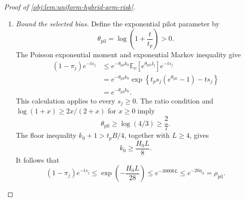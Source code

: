 \begin{proof}[Proof of \cref{obj:lem:uniform-hybrid-arm-risk}]
\begin{enumerate}
The inverse branch mean lies in \([0,p_j]\), by its explicit formula. Moreover,
\((\mathbb E_\nu[\mathcal P_j])^2\le
\mathbb E_\nu[\mathcal P_j^2]\). Hence
\[
\pi_j(1-\pi_j)\delta_j^2
\le
2\pi_j\mathbb E_\nu[\mathcal P_j^2]+2\pi_jp_j^2,
\]
and summing gives
\[
\sum_{j\in\mathcal J_{\mathrm{heavy}}}
\pi_j(1-\pi_j)\delta_j^2
\le
14\rho_{\mathrm{pil}}
\left(\frac1{u\epsilon}+1+\frac1t\right).
\]
Using the mixture variance identity and
\(\operatorname{Var}_\nu(\mathcal P_j)\le
\mathbb E_\nu[\mathcal P_j^2]\), we conclude
\[
\begin{aligned}
\sum_{j\in\mathcal J_{\mathrm{heavy}}}
\operatorname{Var}_\nu(\mathcal V_j)
\le{}&
\sum_{j\in\mathcal J_{\mathrm{heavy}}}
\operatorname{Var}_\nu(\mathcal H_j)\\
&+20\rho_{\mathrm{pil}}
\left(\frac1{u\epsilon}+1+\frac1t\right).
\end{aligned}
\]
Adding the light and heavy bounds proves
\[
\begin{aligned}
\sum_{j=1}^d\operatorname{Var}_\nu(\mathcal V_j)
\le{}&
\sum_{j=1}^d\operatorname{Var}_\nu(\mathcal H_j)\\
&+6F_{\mathrm{grow}}
\left(
\frac{M_{\mathrm{light}}}{u\epsilon}
+\frac{M_{\mathrm{light}}}{t}
+\frac{c_{\mathrm{light}}B^2}{\epsilon^2}
\right)\\
&+2c_{\mathrm{light}}
\left(\frac B{\epsilon L^2}\right)^2
+\frac1{e\,t\epsilon}\\
&+20\rho_{\mathrm{pil}}
\left(\frac1{u\epsilon}+1+\frac1t\right).
\end{aligned}
\]

\item \textit{Bound the selected bias.}
Define the exponential pilot parameter by
\[
\theta_{\mathrm{pil}}=\log\left(1+\frac t{t_p}\right)>0.
\]
The Poisson exponential moment and exponential Markov inequality give
\[
\begin{aligned}
(1-\pi_j)e^{-ts_j}
&\le
e^{-\theta_{\mathrm{pil}}k_0}
\mathbb E_\nu[e^{\theta_{\mathrm{pil}}\mathsf J_j}]
e^{-ts_j}\\
&=
e^{-\theta_{\mathrm{pil}}k_0}
\exp\left\{t_ps_j(e^{\theta_{\mathrm{pil}}}-1)-ts_j\right\}\\
&=e^{-\theta_{\mathrm{pil}}k_0}.
\end{aligned}
\]
This calculation applies to every \(s_j\ge0\). The ratio condition and
\(\log(1+x)\ge2x/(2+x)\) for \(x\ge0\) imply
\[
\theta_{\mathrm{pil}}\ge\log(4/3)\ge\frac27.
\]
The floor inequality \(k_0+1>t_pB/4\), together with \(L\ge4\), gives
\[
k_0\ge\frac{H_0L}{8}.
\]
It follows that
\[
(1-\pi_j)e^{-ts_j}
\le
\exp\left(-\frac{H_0L}{28}\right)
\le e^{-30000L}
\le e^{-20\eta_S}
=\rho_{\mathrm{pil}}.
\]


\end{enumerate}
\end{proof}
